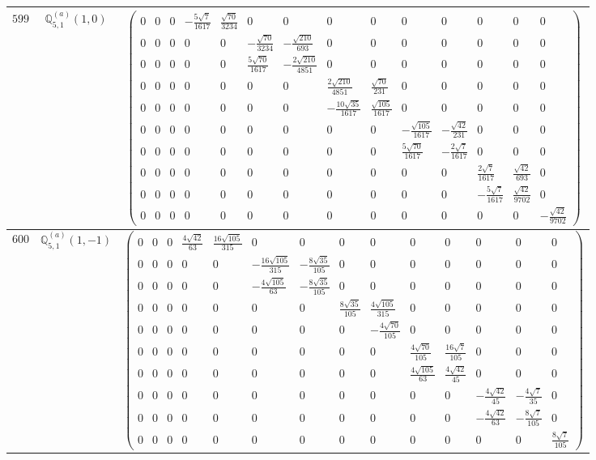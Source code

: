 \documentclass[fleqn,8pt,landscape]{jsarticle}
\begin{document}
\begin{center}
\begin{longtable}{ccc}
$ 599 $ & $ \mathbb{Q}_{5,1}^{(a)}(1,0) $ & $ \begin{pmatrix} 0 & 0 & 0 & - \frac{5 \sqrt{7}}{1617} & \frac{\sqrt{70}}{3234} & 0 & 0 & 0 & 0 & 0 & 0 & 0 & 0 & 0 \\ 0 & 0 & 0 & 0 & 0 & - \frac{\sqrt{70}}{3234} & - \frac{\sqrt{210}}{693} & 0 & 0 & 0 & 0 & 0 & 0 & 0 \\ 0 & 0 & 0 & 0 & 0 & \frac{5 \sqrt{70}}{1617} & - \frac{2 \sqrt{210}}{4851} & 0 & 0 & 0 & 0 & 0 & 0 & 0 \\ 0 & 0 & 0 & 0 & 0 & 0 & 0 & \frac{2 \sqrt{210}}{4851} & \frac{\sqrt{70}}{231} & 0 & 0 & 0 & 0 & 0 \\ 0 & 0 & 0 & 0 & 0 & 0 & 0 & - \frac{10 \sqrt{35}}{1617} & \frac{\sqrt{105}}{1617} & 0 & 0 & 0 & 0 & 0 \\ 0 & 0 & 0 & 0 & 0 & 0 & 0 & 0 & 0 & - \frac{\sqrt{105}}{1617} & - \frac{\sqrt{42}}{231} & 0 & 0 & 0 \\ 0 & 0 & 0 & 0 & 0 & 0 & 0 & 0 & 0 & \frac{5 \sqrt{70}}{1617} & - \frac{2 \sqrt{7}}{1617} & 0 & 0 & 0 \\ 0 & 0 & 0 & 0 & 0 & 0 & 0 & 0 & 0 & 0 & 0 & \frac{2 \sqrt{7}}{1617} & \frac{\sqrt{42}}{693} & 0 \\ 0 & 0 & 0 & 0 & 0 & 0 & 0 & 0 & 0 & 0 & 0 & - \frac{5 \sqrt{7}}{1617} & \frac{\sqrt{42}}{9702} & 0 \\ 0 & 0 & 0 & 0 & 0 & 0 & 0 & 0 & 0 & 0 & 0 & 0 & 0 & - \frac{\sqrt{42}}{9702} \end{pmatrix} $ \\ \hline
$ 600 $ & $ \mathbb{Q}_{5,1}^{(a)}(1,-1) $ & $ \begin{pmatrix} 0 & 0 & 0 & \frac{4 \sqrt{42}}{63} & \frac{16 \sqrt{105}}{315} & 0 & 0 & 0 & 0 & 0 & 0 & 0 & 0 & 0 \\ 0 & 0 & 0 & 0 & 0 & - \frac{16 \sqrt{105}}{315} & - \frac{8 \sqrt{35}}{105} & 0 & 0 & 0 & 0 & 0 & 0 & 0 \\ 0 & 0 & 0 & 0 & 0 & - \frac{4 \sqrt{105}}{63} & - \frac{8 \sqrt{35}}{105} & 0 & 0 & 0 & 0 & 0 & 0 & 0 \\ 0 & 0 & 0 & 0 & 0 & 0 & 0 & \frac{8 \sqrt{35}}{105} & \frac{4 \sqrt{105}}{315} & 0 & 0 & 0 & 0 & 0 \\ 0 & 0 & 0 & 0 & 0 & 0 & 0 & 0 & - \frac{4 \sqrt{70}}{105} & 0 & 0 & 0 & 0 & 0 \\ 0 & 0 & 0 & 0 & 0 & 0 & 0 & 0 & 0 & \frac{4 \sqrt{70}}{105} & \frac{16 \sqrt{7}}{105} & 0 & 0 & 0 \\ 0 & 0 & 0 & 0 & 0 & 0 & 0 & 0 & 0 & \frac{4 \sqrt{105}}{63} & \frac{4 \sqrt{42}}{45} & 0 & 0 & 0 \\ 0 & 0 & 0 & 0 & 0 & 0 & 0 & 0 & 0 & 0 & 0 & - \frac{4 \sqrt{42}}{45} & - \frac{4 \sqrt{7}}{35} & 0 \\ 0 & 0 & 0 & 0 & 0 & 0 & 0 & 0 & 0 & 0 & 0 & - \frac{4 \sqrt{42}}{63} & - \frac{8 \sqrt{7}}{105} & 0 \\ 0 & 0 & 0 & 0 & 0 & 0 & 0 & 0 & 0 & 0 & 0 & 0 & 0 & \frac{8 \sqrt{7}}{105} \end{pmatrix} $ \\ \hline

\end{longtable}
\end{center}
\end{document}
